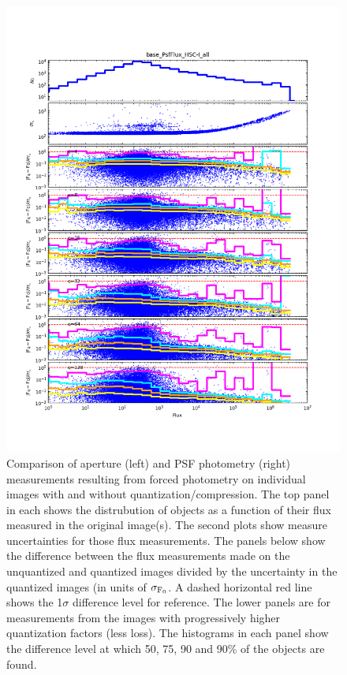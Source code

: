 \begin{figure}[t]
\begin{minipage}{.49\textwidth}
        \includegraphics[width=1.0\textwidth]{figure/rplot_all_base_PsfFlux_HSC-I.png}
    \end{minipage}
\caption{Comparison of aperture (left) and PSF photometry (right) measurements resulting from forced photometry 
on individual images with and without quantization/compression.  The top panel in each shows the distrubution 
of objects as a function of their flux measured in the original image(s).  The second plots show measure uncertainties 
for those flux measurements.  The panels below show the difference between the flux measurements made on the
unquantized and quantized images divided by the uncertainty in the quantized images (in units of $\sigma_{\rm F_0}$.  
A dashed horizontal red line shows the 1$\sigma$ difference level for reference.  The lower panels are for 
measurements from the images with progressively higher quantization factors (less loss).
The histograms in each panel show the difference level at which 50, 75, 90 and 90\% of the objects are found.}
\label{plot_se_flux}
\end{figure}


